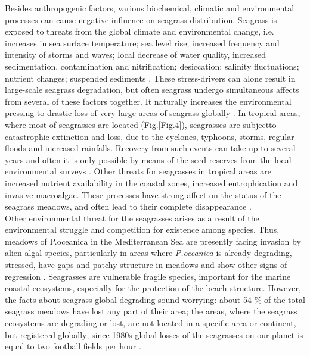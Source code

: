 \documentclass[11pt]{article}
\begin{document}
Besides anthropogenic factors, various biochemical, climatic and environmental processes can cause
negative influence on seagrass distribution. Seagrass is exposed to threats from the global climate and
environmental change, i.e. increases in sea surface temperature; sea level rise; increased frequency
and intensity of storms and waves; local decrease of water quality, increased sedimentation,
contamination and nitrification; desiccation; salinity fluctuations; nutrient changes; suspended
sediments \cite{Blake00}\label{Blake00}. These stress-drivers can alone result in large-scale seagrass
degradation, but often seagrass undergo simultaneous affects from several of these factors together.
It naturally increases the environmental pressing  to drastic loss of very large areas of
seagrass globally \cite{Orth06}\label{Orth06}.
In tropical areas, where most of seagrasses are located (Fig.\ref{Fig.4}), seagrasses are subjectto catastrophic
extinction and loss, due to the cyclones, typhoons, storms, regular floods and increased rainfalls. Recovery from such
events can take up to several years and often it is only possible by means of the seed reserves from the local
environmental surveys \cite{McKenzie07}\label{McKenzie07}. Other threats for seagrasses in tropical areas are 
increased nutrient availability in the coastal zones, increased
eutrophication and invasive macroalgae. These processes have strong affect on the status of the
seagrass meadows, and often lead to their complete disappearance \cite{Holmer09}\label{Holmer09}.\\
Other environmental threat for the seagrasses arises as a result of the environmental struggle and
competition for existence among species. Thus, meadows of P.oceanica in the Mediterranean Sea are
presently facing invasion by alien algal species, particularly in areas where \textit{P.oceanica} is already
degrading, stressed, have gaps and patchy structure in meadows and show other signs of regression
\cite{Montefalcone10}\label{Montefalcone10}.
Seagrasses are vulnerable fragile species, important for the marine coastal ecosystems, especially for
the protection of the beach structure. However, the facts about seagrass global degrading sound
worrying: about 54 \% of the total seagrass meadows have lost any part of their area; the areas, where
the seagrass ecosystems are degrading or lost, are not located in a specific area or continent, but
registered globally; since 1980s global losses of the seagrasses on our planet is equal to two football
fields per hour \cite{Mellors09b}\label{Mellors09b}.
\pagebreak
\end{document}
